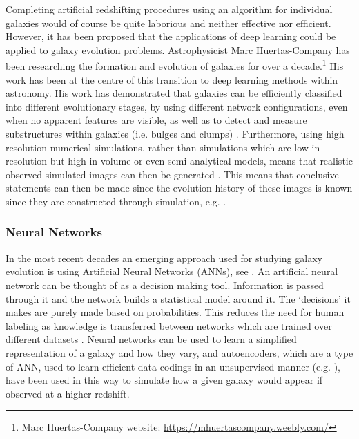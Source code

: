 \documentclass[fleqn,usenatbib]{mnras}
\begin{document}
Completing artificial redshifting procedures using an algorithm for individual galaxies would of course be quite laborious and neither effective nor efficient. However, it has been proposed that the applications of deep learning could be applied to galaxy evolution problems. 
Astrophysicist Marc Huertas-Company has been researching the formation and evolution of galaxies for over a decade.\footnote{Marc Huertas-Company website: \url{https://mhuertascompany.weebly.com/}} His work has been at the centre of this transition to deep learning methods within astronomy. His work has demonstrated that galaxies can be efficiently classified into different evolutionary stages, by using different network configurations, even when no apparent features are visible, as well as to detect and measure substructures within galaxies (i.e. bulges and clumps) \citep{Huertas-Company2021}. Furthermore, using high resolution numerical simulations, rather than simulations which are low in resolution but high in volume or even semi-analytical models, means that realistic observed simulated images can then be generated \citep{Huertas-Company2018}. This means that conclusive statements can then be made since the evolution history of these images is known since they are constructed through simulation, e.g. \citet{Snyder2015}.


\subsubsection{Neural Networks}
\label{sec:neural_networks}

In the most recent decades an emerging approach used for studying galaxy evolution is using Artificial Neural Networks (ANNs), see \citet{Storrie-Lombardi1992}. An artificial neural network can be thought of as a decision making tool. Information is passed through it and the network builds a statistical model around it. The ‘decisions’ it makes are purely made based on probabilities. This reduces the need for human labeling as knowledge is transferred between networks which are trained over different datasets \citep{Sanchez2018}. Neural networks can be used to learn a simplified representation of a galaxy and how they vary, and autoencoders, which are a type of ANN, used to learn efficient data codings in an unsupervised manner (e.g. \citet{Schawinski2018,Glaser2019}), have been used in this way to simulate how a given galaxy would appear if observed at a higher redshift.
\end{document}
